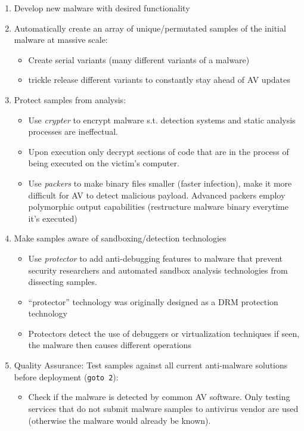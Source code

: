 \documentclass[11pt,oneside,a4paper]{article}
\begin{document}
\vspace{-\topsep}
\begin{enumerate}
	\setlength{\itemsep}{0pt}
	\setlength{\parskip}{0pt}
	\item Develop new malware with desired functionality
	\item Automatically create an array of unique/permutated samples of the	initial malware at massive scale:
	\begin{itemize}
		\item Create serial variants (many different variants of a malware)
		\item trickle release different variants to constantly stay ahead of AV updates
	\end{itemize}

	\item Protect samples from analysis:
	\begin{itemize}
		\item Use \textit{crypter} to encrypt malware s.t. detection systems and static analysis processes are ineffectual.
		\item Upon execution only decrypt sections of code that are in the process of being executed on the victim’s computer.
		\item Use \textit{packers} to make binary files smaller (faster infection), make it more difficult for AV to detect malicious payload. Advanced packers employ polymorphic output capabilities (restructure malware binary everytime it's executed)
	\end{itemize}

	\item Make samples aware of sandboxing/detection technologies
	\begin{itemize}
		\item Use \textit{protector} to add anti-debugging features to malware that prevent security researchers and automated sandbox analysis technologies from dissecting samples.
		\item “protector” technology was originally designed as a DRM protection technology
		\item Protectors detect the use of debuggers or virtualization techniques if seen, the malware then causes different operations
	\end{itemize}
	\item Quality Assurance: Test samples against all current anti-malware solutions before deployment (\texttt{goto 2}):
	\begin{itemize}
		\item Check if the malware is detected by common AV software. Only testing services that do not submit malware samples to antivirus vendor are used (otherwise the malware would already be known).
	\end{itemize}
\end{enumerate}
\vspace{-\topsep}
\end{document}
